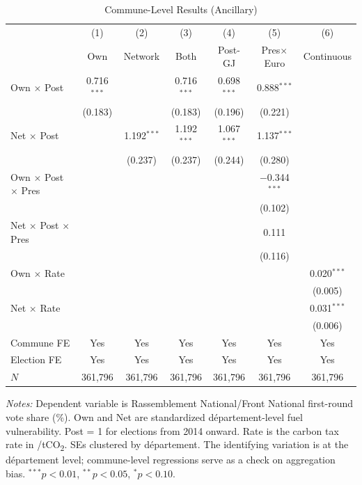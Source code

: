 \documentclass[12pt]{article}
\providecommand{\euro}{\texteuro}
\newcommand{\rn}{Rassemblement National}
\newcommand{\fn}{Front National}
\newcommand{\dept}{d\'{e}partement}
\begin{document}
\begin{table}[H]
\centering
\caption{Commune-Level Results (Ancillary)}
\label{tab:main}
\begin{threeparttable}
\begin{tabular}{@{}lcccccc@{}}
\toprule
 & (1) & (2) & (3) & (4) & (5) & (6) \\
 & Own & Network & Both & Post-GJ & Pres$\times$Euro & Continuous \\
\midrule
Own $\times$ Post & 0.716$^{***}$ & & 0.716$^{***}$ & 0.698$^{***}$ & 0.888$^{***}$ & \\
 & (0.183) & & (0.183) & (0.196) & (0.221) & \\[3pt]
Net $\times$ Post & & 1.192$^{***}$ & 1.192$^{***}$ & 1.067$^{***}$ & 1.137$^{***}$ & \\
 & & (0.237) & (0.237) & (0.244) & (0.280) & \\[3pt]
Own $\times$ Post $\times$ Pres & & & & & $-$0.344$^{***}$ & \\
 & & & & & (0.102) & \\[3pt]
Net $\times$ Post $\times$ Pres & & & & & 0.111 & \\
 & & & & & (0.116) & \\[3pt]
Own $\times$ Rate & & & & & & 0.020$^{***}$ \\
 & & & & & & (0.005) \\[3pt]
Net $\times$ Rate & & & & & & 0.031$^{***}$ \\
 & & & & & & (0.006) \\[3pt]
\midrule
Commune FE & Yes & Yes & Yes & Yes & Yes & Yes \\
Election FE & Yes & Yes & Yes & Yes & Yes & Yes \\
$N$ & 361,796 & 361,796 & 361,796 & 361,796 & 361,796 & 361,796 \\
\bottomrule
\end{tabular}
\begin{tablenotes}
\small
\item \textit{Notes:} Dependent variable is \rn{}/\fn{} first-round vote share (\%). Own and Net are standardized \dept{}-level fuel vulnerability. Post = 1 for elections from 2014 onward. Rate is the carbon tax rate in \euro/tCO\textsubscript{2}. SEs clustered by \dept{}. The identifying variation is at the \dept{} level; commune-level regressions serve as a check on aggregation bias. $^{***}p<0.01$, $^{**}p<0.05$, $^{*}p<0.10$.
\end{tablenotes}
\end{threeparttable}
\end{table}
\end{document}
